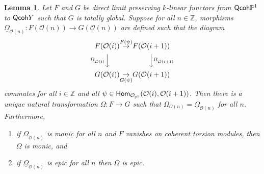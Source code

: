 \documentclass[10pt]{amsart}
\newtheorem{lemma}{Lemma}[section]
\theoremstyle{definition}
\theoremstyle{remark}
\numberwithin{equation}{section}
\begin{document}
\begin{lemma} \label{lemma.inductive}
Let $F$ and $G$ be direct limit preserving $k$-linear functors from ${\sf Qcoh }\mathbb{P}^{1}$ to ${\sf Qcoh }Y$ such that $G$ is totally global.  Suppose for all $n \in \mathbb{Z}$, morphisms $\underline{\Omega}_{\mathcal{O}(n)}:F(\mathcal{O}(n)) \rightarrow G(\mathcal{O}(n))$ are defined such that the diagram
$$
\begin{CD}
F(\mathcal{O}(i)) & \overset{F(\psi)}{\rightarrow} & F(\mathcal{O}(i+1)) \\
@V{\underline{\Omega}_{\mathcal{O}(i)}}VV @VV{\underline{\Omega}_{\mathcal{O}(i+1)}}V \\
G(\mathcal{O}(i)) & \underset{G(\psi)}{\rightarrow} & G(\mathcal{O}(i+1))
\end{CD}
$$
commutes for all $i \in \mathbb{Z}$ and all $\psi \in {\sf Hom}_{\mathcal{O}_{\mathbb{P}^{1}}}(\mathcal{O}(i),\mathcal{O}(i+1))$.  Then there is a unique natural transformation $\Omega:F \rightarrow G$ such that $\Omega_{\mathcal{O}(n)}=\underline{\Omega}_{\mathcal{O}(n)}$ for all $n$.  Furthermore,
\begin{enumerate}
\item{} if $\underline{\Omega}_{\mathcal{O}(n)}$ is monic for all $n$ and $F$ vanishes on coherent torsion modules, then $\Omega$ is monic, and

\item{} if $\underline{\Omega}_{\mathcal{O}(n)}$ is epic for all $n$ then $\Omega$ is epic.
\end{enumerate}
\end{lemma}
\end{document}

